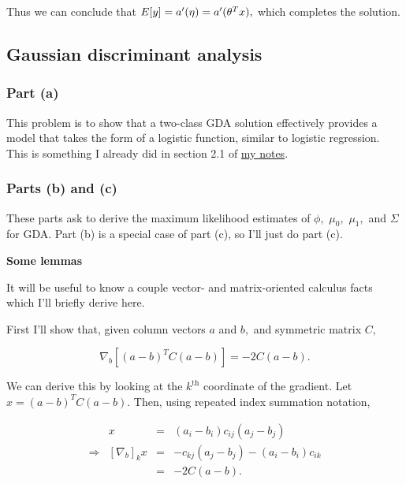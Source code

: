 \documentclass[]{article}
\begin{document}
Thus we can conclude that \(E[y] = a'(\eta) = a'(\theta^Tx),\) which
completes the solution.

\subsection{Gaussian discriminant
analysis}\label{gaussian-discriminant-analysis}

\subsubsection{Part (a)}\label{part-a-2}

This problem is to show that a two-class GDA solution effectively
provides a model that takes the form of a logistic function, similar to
logistic regression. This is something I already did in section 2.1 of
\href{http://tylerneylon.com/notes/cs229/cs229.html}{my notes}.

\subsubsection{Parts (b) and (c)}\label{parts-b-and-c}

These parts ask to derive the maximum likelihood estimates of \(\phi,\)
\(\mu_0,\) \(\mu_1,\) and \(\Sigma\) for GDA. Part (b) is a special case
of part (c), so I'll just do part (c).

\textbf{Some lemmas}

It will be useful to know a couple vector- and matrix-oriented calculus
facts which I'll briefly derive here.

First I'll show that, given column vectors \(a\) and \(b,\) and
symmetric matrix \(C,\)

\begin{equation}\nabla_b [ (a-b)^T C (a-b) ] = -2C(a-b).\label{eq:nabla_b}\end{equation}

We can derive this by looking at the \(k^\text{th}\) coordinate of the
gradient. Let \(x = (a-b)^T C (a-b).\) Then, using repeated index
summation notation,

\[\begin{array}{crcl}
& x & = & (a_i - b_i)c_{ij}(a_j-b_j) \\
\Rightarrow & [\nabla_b]_k x & = & -c_{kj}(a_j - b_j) - (a_i - b_i)c_{ik} \\
 & & = & -2C(a-b). \\
\end{array}\]
\end{document}
